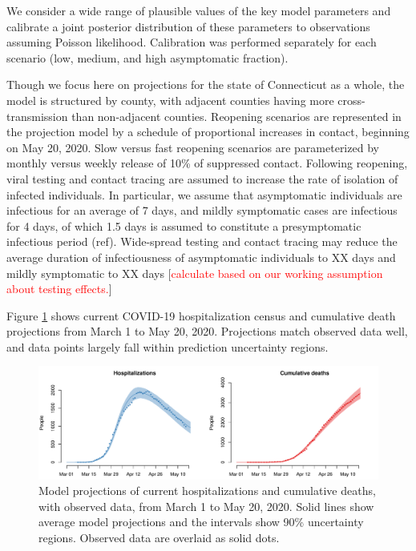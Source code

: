 \documentclass[11pt]{article}
\newcommand{\comment}[1]{[\textcolor{red}{#1}]}
\begin{document}
We consider a wide range of plausible values of the key model parameters and calibrate a joint posterior distribution of these parameters to observations assuming Poisson likelihood. Calibration was performed separately for each scenario (low, medium, and high asymptomatic fraction).

Though we focus here on projections for the state of Connecticut as a whole, the model is structured by county, with adjacent counties having more cross-transmission than non-adjacent counties.  Reopening scenarios are represented in the projection model by a schedule of proportional increases in contact, beginning on May 20, 2020. Slow versus fast reopening scenarios are parameterized by monthly versus weekly release of 10\% of suppressed contact. 
Following reopening, viral testing and contact tracing are assumed to increase the rate of isolation of infected individuals. In particular, we assume that asymptomatic individuals are infectious for an average of 7 days, and mildly symptomatic cases are infectious for 4 days, of which 1.5 days is assumed to constitute a presymptomatic infectious period (ref). Wide-spread testing and contact tracing may reduce the average duration of infectiousness of asymptomatic individuals to XX days and mildly symptomatic to XX days \comment{calculate based on our working assumption about testing effects.}



Figure \ref{fig:calibration} shows current COVID-19 hospitalization census and cumulative death projections from March 1 to May 20, 2020.  Projections match observed data well, and data points largely fall within prediction uncertainty regions. 


\begin{figure}
\centering
\includegraphics[width=\textwidth]{figures/calibration.pdf}
\caption{Model projections of current hospitalizations and cumulative deaths, with observed data, from March 1 to May 20, 2020. Solid lines show average model projections and the intervals show 90\% uncertainty regions.  Observed data are overlaid as solid dots.} 
\label{fig:calibration}
\end{figure}
\end{document}
